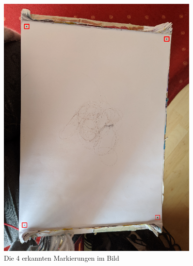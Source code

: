 \documentclass[german,a4paper,12pt]{llncs}
\begin{document}
\begin{figure}
	\centering
	\includegraphics[width=0.9\textwidth]{fig64/03rectImg.png}
	\caption[]{Die 4 erkannten Markierungen im Bild}
	\label{img:foundDots}
\end{figure}
\end{document}
